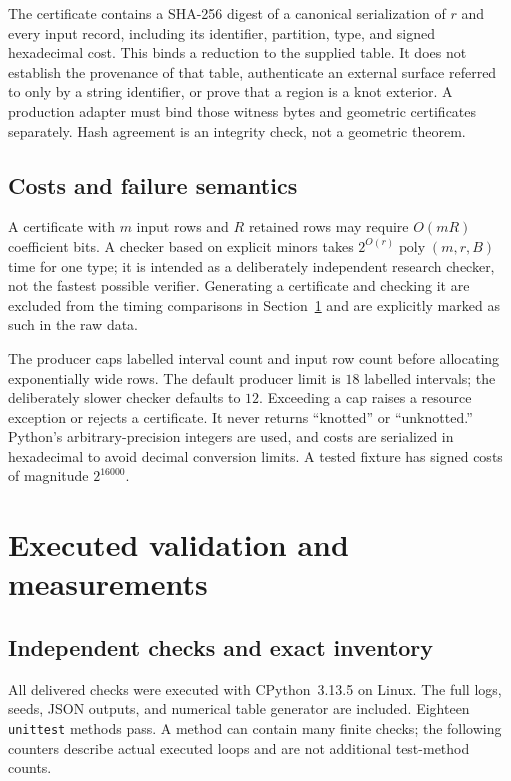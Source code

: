 \documentclass[11pt,a4paper]{article}
\theoremstyle{remark}\newtheorem{remark}[theorem]{Remark}
\newcommand{\poly}{\operatorname{poly}}
\begin{document}
The certificate contains a SHA-256 digest of a canonical serialization of $r$ and every input record, including its identifier, partition, type, and signed hexadecimal cost. This binds a reduction to the supplied table. It does not establish the provenance of that table, authenticate an external surface referred to only by a string identifier, or prove that a region is a knot exterior. A production adapter must bind those witness bytes and geometric certificates separately. Hash agreement is an integrity check, not a geometric theorem.

\subsection{Costs and failure semantics}
A certificate with $m$ input rows and $R$ retained rows may require $O(mR)$ coefficient bits. A checker based on explicit minors takes $2^{O(r)}\poly(m,r,B)$ time for one type; it is intended as a deliberately independent research checker, not the fastest possible verifier. Generating a certificate and checking it are excluded from the timing comparisons in Section~\ref{sec:experiments} and are explicitly marked as such in the raw data.

The producer caps labelled interval count and input row count before allocating exponentially wide rows. The default producer limit is $18$ labelled intervals; the deliberately slower checker defaults to $12$. Exceeding a cap raises a resource exception or rejects a certificate. It never returns ``knotted'' or ``unknotted.'' Python's arbitrary-precision integers are used, and costs are serialized in hexadecimal to avoid decimal conversion limits. A tested fixture has signed costs of magnitude $2^{16000}$.

\section{Executed validation and measurements}\label{sec:experiments}
\subsection{Independent checks and exact inventory}
All delivered checks were executed with CPython~3.13.5 on Linux. The full logs, seeds, JSON outputs, and numerical table generator are included. Eighteen \texttt{unittest} methods pass. A method can contain many finite checks; the following counters describe actual executed loops and are not additional test-method counts.
\end{document}
